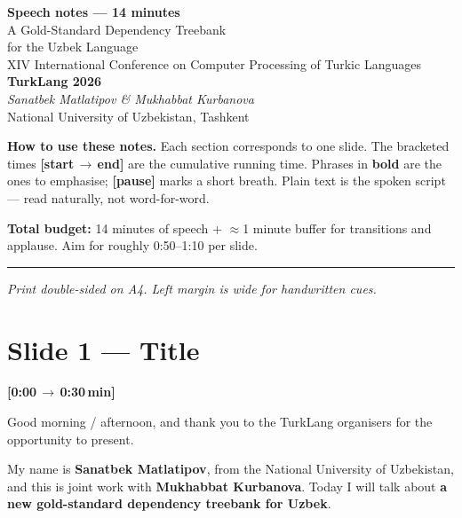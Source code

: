 \documentclass[12pt,a4paper]{article}
\newcommand{\timing}[2]{%
   \par\noindent\textbf{\small [#1\,$\to$\,#2\,min]}\par\vspace{0.2em}}
\newcommand{\say}[1]{\textbf{#1}}
\begin{document}
\begin{center}
   {\LARGE\bfseries Speech notes — 14 minutes}\\[0.6em]
   {\large A Gold-Standard Dependency Treebank\\ for the Uzbek Language}\\[0.4em]
   {\normalsize XIV International Conference on Computer Processing of Turkic Languages}\\
   {\normalsize \textbf{TurkLang 2026}}\\[1.2em]
   \textit{Sanatbek Matlatipov \quad \& \quad Mukhabbat Kurbanova}\\
   National University of Uzbekistan, Tashkent
\end{center}

\vspace{1em}
\noindent\textbf{How to use these notes.}
Each section corresponds to one slide. The bracketed times
\textbf{[start\,$\to$\,end]} are the cumulative running time. Phrases in
\textbf{bold} are the ones to emphasise; \textbf{[pause]} marks a short
breath. Plain text is the spoken script — read naturally, not word-for-word.

\vspace{0.5em}
\noindent\textbf{Total budget:} 14 minutes of speech + $\approx$1 minute buffer
for transitions and applause. Aim for roughly 0:50--1:10 per slide.

\vfill\hrule\vspace{0.5em}
\noindent\textit{Print double-sided on A4. Left margin is wide for handwritten cues.}

\newpage

\section*{Slide 1 — Title}
\timing{0:00}{0:30}

Good morning / afternoon, and thank you to the TurkLang organisers for the
opportunity to present.

My name is \say{Sanatbek Matlatipov}, from the National University of
Uzbekistan, and this is joint work with \say{Mukhabbat Kurbanova}. Today I will
talk about \say{a new gold-standard dependency treebank for Uzbek}.
\end{document}
